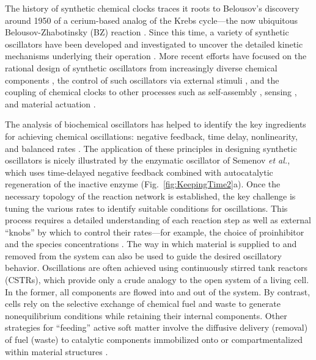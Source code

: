 \begin{appendices}
The history of synthetic chemical clocks traces it roots to Belousov's discovery around 1950 of a cerium-based analog of the Krebs cycle---the now ubiquitous Belousov-Zhabotinsky (BZ) reaction \autocite{winfree1984prehistory}. Since this time, a variety of synthetic oscillators have been developed and investigated to uncover the detailed kinetic mechanisms underlying their operation \autocite{epstein1998introduction}. More recent efforts have focused on the rational design of synthetic oscillators from increasingly diverse chemical components \autocite{DeKepper1981, Kurin-Csorgel2005, semenov2015rational, Semenov2016}, the control of such oscillators via external stimuli \autocite{Petrov1997, pogodaev2017photochemical}, and the coupling of chemical clocks to other processes such as self-assembly \autocite{Lagzi2010,tagliazucchi2014dissipative}, sensing \autocite{Epstein2012}, and material actuation \autocite{Yashin2012, Yoshida2014, Tamate2016}.  

The analysis of biochemical oscillators has helped to identify the key ingredients for achieving chemical oscillations: negative feedback, time delay, nonlinearity, and balanced rates \autocite{Novak2008}.  The application of these principles in designing synthetic oscillators is nicely illustrated by the enzymatic oscillator of Semenov \emph{et al.}, which uses time-delayed negative feedback combined with autocatalytic regeneration of the inactive enzyme \autocite{semenov2015rational} (Fig.~\ref{fig:KeepingTime2}a). Once the necessary topology of the reaction network is established, the key challenge is tuning the various rates to identify suitable conditions for oscillations. This process requires a detailed understanding of each reaction step as well as external ``knobs'' by which to control their rates---for example, the choice of proinhibitor and the species concentrations \autocite{semenov2015rational}.  The way in which material is supplied to and removed from the system can also be used to guide the desired oscillatory behavior. Oscillations are often achieved using continuously stirred tank reactors (CSTRs), which provide only a crude analogy to the open system of a living cell. In the former, all components are flowed into and out of the system. By contrast, cells rely on the selective exchange of chemical fuel and waste to generate nonequilibrium conditions while retaining their internal components.  Other strategies for ``feeding'' active soft matter involve the diffusive delivery (removal) of fuel (waste) to catalytic components immobilized onto or compartmentalized within material structures \autocite{zhang2014giant, Tamate2016}.


\end{appendices}
